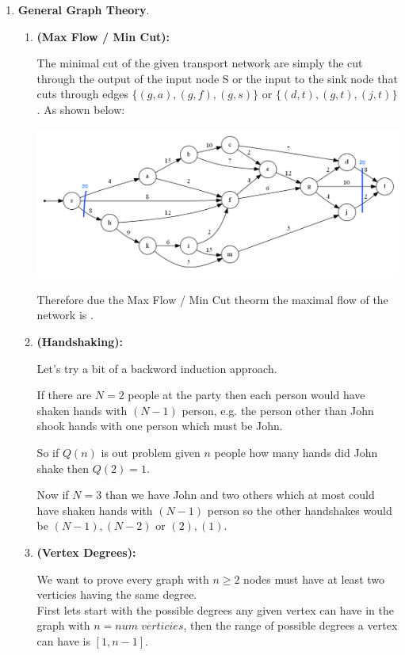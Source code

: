 \documentclass{article}
\begin{document}
\begin{enumerate}
    \item \textbf{General Graph Theory}.
    \begin{enumerate}
        \item \textbf{(Max Flow / Min Cut):}
        
        The minimal cut of the given transport network are simply the cut through the output of the input node S or the input to the sink node that cuts through edges $\{(g,a), (g, f), (g, s)\}$ or $\{(d,t), (g,t), (j,t)\}$. 
        As shown below:

        \includegraphics[scale=0.4]{2a}

        Therefore due the Max Flow / Min Cut theorm the maximal flow of the network is .

        \item \textbf{(Handshaking):}
        
        Let's try a bit of a backword induction approach.
        
        If there are $N = 2$ people at the party then each person would have shaken hands with $(N - 1)$ person, e.g. the person other than John shook hands with one person which must be John.

        So if $Q(n)$ is out problem given $n$ people how many hands did John shake then $Q(2) = 1$.

        Now if $N = 3$ than we have John and two others which at most could have shaken hands with $(N - 1)$ person so the other handshakes would be $(N - 1), (N - 2)$ or $(2),(1)$.

        \item \textbf{(Vertex Degrees):}
        
        We want to prove every graph with $n \geq 2$ nodes must have at least two verticies having the same degree. \\
                
        First lets start with the possible degrees any given vertex can have in the graph with $n = num\;verticies$, then the range of possible degrees a vertex can have is $[1, n - 1]$. \\
        

\end{enumerate}
\end{enumerate}
\end{document}
